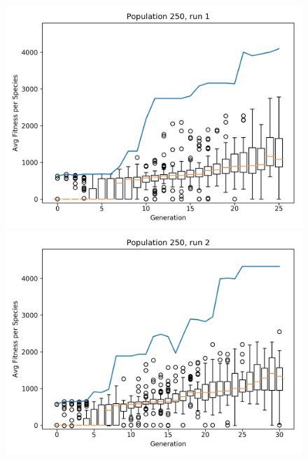 			\begin{figure}[h]
				\centering
				\begin{minipage}{0.33\textwidth}
					\centering
					\includegraphics[width=1\textwidth]{graphics/mario/pop250_run1} %
				\end{minipage}\hfill
				\begin{minipage}{0.33\textwidth}
					\centering
					\includegraphics[width=1\textwidth]{graphics/mario/pop250_run2} %
				\end{minipage}
				\begin{minipage}{0.33\textwidth}
					\centering

\end{minipage}
\end{figure}
